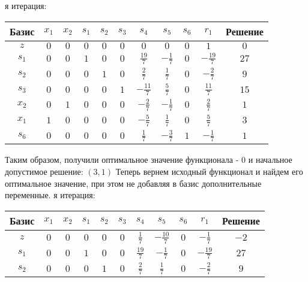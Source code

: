 \documentclass{article}%
\begin{document}
\begin{flushleft}
\newline%
\newline%
я итерация: %
\newline%
\newline%
\renewcommand{\arraystretch}{1.3}%
\begin{tabular}{|c|ccccccccc|c|}%
\hline%
Базис&$x_{1}$&$x_{2}$&$s_{1}$&$s_{2}$&$s_{3}$&$s_{4}$&$s_{5}$&$s_{6}$&$r_{1}$&Решение\\%
\hline%
$z$&$0$&$0$&$0$&$0$&$0$&$0$&$0$&$0$&$1$&$0$\\%
\hline%
$s_{1}$&$0$&$0$&$1$&$0$&$0$&$\frac{19}{7}$&$-\frac{1}{7}$&$0$&$-\frac{19}{7}$&$27$\\%
$s_{2}$&$0$&$0$&$0$&$1$&$0$&$\frac{2}{7}$&$\frac{1}{7}$&$0$&$-\frac{2}{7}$&$9$\\%
$s_{3}$&$0$&$0$&$0$&$0$&$1$&$-\frac{11}{7}$&$\frac{5}{7}$&$0$&$\frac{11}{7}$&$15$\\%
$x_{2}$&$0$&$1$&$0$&$0$&$0$&$-\frac{2}{7}$&$-\frac{1}{7}$&$0$&$\frac{2}{7}$&$1$\\%
$x_{1}$&$1$&$0$&$0$&$0$&$0$&$-\frac{5}{7}$&$\frac{1}{7}$&$0$&$\frac{5}{7}$&$3$\\%
$s_{6}$&$0$&$0$&$0$&$0$&$0$&$\frac{1}{7}$&$-\frac{3}{7}$&$1$&$-\frac{1}{7}$&$1$\\%
\hline%
\end{tabular}%
\newline%
\newline%
Таким образом, получили оптимальное значение функционала {-} 0 и начальное допустимое решение: %
$(3, 1)$%
\newline%
Теперь вернем исходный функционал и найдем его оптимальное значение, при этом не добавляя в базис дополнительные переменные.%
я итерация: %
\newline%
\newline%
\renewcommand{\arraystretch}{1.3}%
\begin{tabular}{|c|ccccccccc|c|}%
\hline%
Базис&$x_{1}$&$x_{2}$&$s_{1}$&$s_{2}$&$s_{3}$&$s_{4}$&$s_{5}$&$s_{6}$&$r_{1}$&Решение\\%
\hline%
$z$&$0$&$0$&$0$&$0$&$0$&$\frac{1}{7}$&$-\frac{10}{7}$&$0$&$-\frac{1}{7}$&$-2$\\%
\hline%
$s_{1}$&$0$&$0$&$1$&$0$&$0$&$\frac{19}{7}$&$-\frac{1}{7}$&$0$&$-\frac{19}{7}$&$27$\\%
$s_{2}$&$0$&$0$&$0$&$1$&$0$&$\frac{2}{7}$&$\frac{1}{7}$&$0$&$-\frac{2}{7}$&$9$\\%

\end{tabular}
\end{flushleft}
\end{document}
